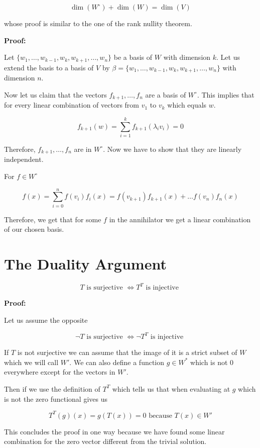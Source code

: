 \[
    \dim(W^{\circ}) + \dim(W) = \dim(V)
\]

whose proof is similar to the one of the rank nullity theorem.

\textbf{Proof:}

Let \( \{w_1, \dots, w_{k - 1}, w_{k}, w_{k + 1}, \dots, w_n\}\) be a basis of \(W\) with dimension \(k\). 
Let us extend the basis to a basis of \(V\) by \(\beta = \{w_1, \dots, w_{k - 1}, w_{k}, w_{k + 1}, \dots, w_n\}\) with dimension \(n\).

Now let us claim that the vectors \(f_{k + 1}, \dots, f_{n}\) are a basis of \(W^{\circ}\). This implies that for every linear combination 
of vectors from \(v_1\) to \(v_k\) which equals \(w\). 

\[
    f_{k + 1}(w) = \sum_{i = 1}^{k} f_{k + 1}(\lambda_i v_i) = 0
\]

Therefore, \(f_{k + 1}, \dots, f_{n}\) are in \(W^{\circ}\). Now we have to show that they are linearly independent.

For \(f \in W^{\circ}\)

\[
    f(x) = \sum_{i = 0}^{n} f(v_i)f_i(x) = f(v_{k + 1})f_{k + 1}(x) + \dots f(v_n)f_n(x)
\]

Therefore, we get that for some \(f\) in the annihilator we get a linear combination of our chosen basis. 

\QED

\section{The Duality Argument}

\[
    T \text{ is surjective } \iff T^{T} \text{ is injective }
\]

\textbf{Proof:}

Let us assume the opposite

\[
    \neg T \text{ is surjective } \iff \neg T^{T} \text{ is injective }
\]

If \(T\) is not surjective we can assume that the image of it is a strict subset of \(W\) which we will call \(W'\). We can also define a function 
\(g \in W^*\) which is not 0 everywhere except for the vectors in \(W'\). 

Then if we use the definition of \(T^{T}\) which tells us that when evaluating at \(g\) which is not the zero functional gives us 

\[
    T^T(g)(x) = g(T(x)) = 0 \text{ because } T(x) \in W'
\]

This concludes the proof in one way because we have found some linear combination for the zero vector different from the trivial solution.

